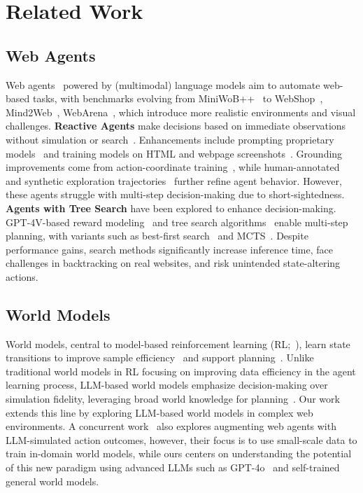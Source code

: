 \section{Related Work}
\subsection{Web Agents}
Web agents~\citep{Su2024LanguageAgents} powered by (multimodal) language models aim to automate web-based tasks, with benchmarks evolving from MiniWoB++~\citep{pmlr-v70-shi17a, liu2018reinforcement} to WebShop~\citep{yao2022webshop}, Mind2Web~\citep{mind2web}, WebArena~\citep{zhou2023webarena,koh2024visualwebarena}, which introduce more realistic environments and visual challenges. \textbf{Reactive Agents} make decisions based on immediate observations without simulation or search~\citep{react}. Enhancements include prompting proprietary models~\citep{zheng2024seeact, he2024webvoyager, mind2web} and training models on HTML and webpage screenshots~\citep{lee2023pix2struct, gur2023real, furuta2023multimodal, hong2024cogagent, baechler2024screenai}. 
Grounding improvements come from action-coordinate training~\citep{you2024ferret, cheng2024seeclick, gou2024uground}, while human-annotated~\citep{shaw2023pixels, hong2024cogagent, mind2web, lai2024autowebglm} and synthetic exploration trajectories~\citep{furuta2023multimodal, song2024trial, patel2024large, pahuja2025explorer} further refine agent behavior. However, these agents struggle with multi-step decision-making due to short-sightedness.
\textbf{Agents with Tree Search} have been explored to enhance decision-making. GPT-4V-based reward modeling~\citep{pan2024autonomous} and tree search algorithms~\citep{koh2024tree, putta2024agent, zhang2024webpilot} enable multi-step planning, with variants such as best-first search~\citep{koh2024tree} and MCTS~\citep{putta2024agent, zhang2024webpilot}. Despite performance gains, search methods significantly increase inference time, face challenges in backtracking on real websites, and risk unintended state-altering actions.

\subsection{World Models}
World models, central to model-based reinforcement learning (RL;~\cite{moerland2023model, sutton1991dyna}), learn state transitions to improve sample efficiency~\citep{ha2018world} and support planning~\citep{pascanu2017learning, schrittwieser2020mastering}.
Unlike traditional world models in RL focusing on improving data efficiency in the agent learning process, LLM-based world models emphasize decision-making over simulation fidelity, leveraging broad world knowledge for planning~\citep{world, kim2024cognitive}.
Our work extends this line by exploring LLM-based world models in complex web environments.
A concurrent work~\citep{chae2024web} also explores augmenting web agents with LLM-simulated action outcomes, however, their focus is to use small-scale data to train in-domain world models, while ours centers on understanding the potential of this new paradigm using advanced LLMs such as GPT-4o~\citep{GPT-4o} and self-trained general world models.

